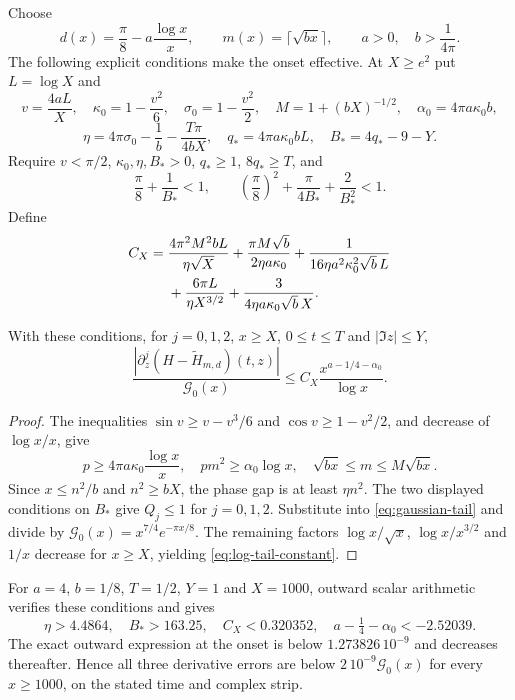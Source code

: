 Choose
\[
 d(x)=\frac\pi8-a\frac{\log x}{x},\qquad
 m(x)=\lceil\sqrt{b x}\rceil,\qquad a>0,\quad b>\frac1{4\pi}.
\]
The following explicit conditions make the onset effective. At $X\ge e^2$
put $L=\log X$ and
\[
 v=\frac{4aL}{X},\quad \kappa_0=1-\frac{v^2}6,\quad
 \sigma_0=1-\frac{v^2}2,\quad M=1+(bX)^{-1/2},\quad
 \alpha_0=4\pi a\kappa_0b,
\]
\[
 \eta=4\pi\sigma_0-\frac1b-\frac{T\pi}{4bX},\quad
 q_*=4\pi a\kappa_0bL,\quad B_*=4q_*-9-Y.
\]
Require $v<\pi/2$, $\kappa_0,\eta,B_*>0$, $q_*\ge1$,
$8q_*\ge T$, and
\[
 \frac\pi8+\frac1{B_*}<1,\qquad
 \left(\frac\pi8\right)^2+\frac{\pi}{4B_*}+\frac2{B_*^2}<1.
\]
Define
\begin{align}
 C_X={}&\frac{4\pi^2M^2bL}{\eta\sqrt X}
 +\frac{\pi M\sqrt b}{2\eta a\kappa_0}
 +\frac1{16\eta a^2\kappa_0^2\sqrt b\,L}\notag\\
 &+\frac{6\pi L}{\eta X^{3/2}}
 +\frac3{4\eta a\kappa_0\sqrt b\,X}.\label{eq:log-tail-constant}
\end{align}
\begin{proposition}\label{prop:effective-log-tail}
With these conditions, for $j=0,1,2$, $x\ge X$,
$0\le t\le T$ and $|\Im z|\le Y$,
\begin{equation}\label{eq:effective-log-tail}
 \frac{|\partial_z^j(H-\widetilde H_{m,d})(t,z)|}{\mathcal G_0(x)}
 \le C_X\frac{x^{a-1/4-\alpha_0}}{\log x}.
\end{equation}
\end{proposition}
\begin{proof}
The inequalities $\sin v\ge v-v^3/6$ and $\cos v\ge1-v^2/2$,
and decrease of $\log x/x$, give
\[
 p\ge4\pi a\kappa_0\frac{\log x}{x},\quad
 pm^2\ge\alpha_0\log x,\quad
 \sqrt{bx}\le m\le M\sqrt{bx}.
\]
Since $x\le n^2/b$ and $n^2\ge bX$, the phase gap is at least
$\eta n^2$. The two displayed conditions on $B_*$ give $Q_j\le1$
for $j=0,1,2$. Substitute into \eqref{eq:gaussian-tail} and divide
by $\mathcal G_0(x)=x^{7/4}e^{-\pi x/8}$.
The remaining factors $\log x/\sqrt x$, $\log x/x^{3/2}$
and $1/x$ decrease for $x\ge X$, yielding \eqref{eq:log-tail-constant}.
\end{proof}

For $a=4$, $b=1/8$, $T=1/2$, $Y=1$ and $X=1000$, outward scalar
arithmetic verifies these conditions and gives
\[
 \eta>4.4864,\quad B_*>163.25,\quad C_X<0.320352,\quad
 a-\tfrac14-\alpha_0<-2.52039.
\]
The exact outward expression at the onset is below
$1.273826\,10^{-9}$ and decreases thereafter. Hence all three
derivative errors are below $2\,10^{-9}\mathcal G_0(x)$ for every
$x\ge1000$, on the stated time and complex strip.

